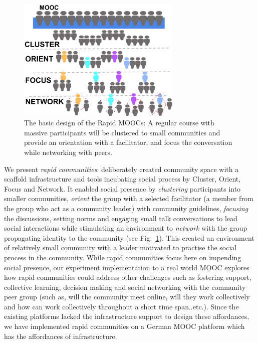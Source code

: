 \documentclass[manuscript,screen,review]{acmart}
\begin{document}
\begin{figure}[h]
  \centering
  \includegraphics[width=0.7\textwidth]{images/Framework.png}
  \caption{The basic design of the Rapid MOOCs: A regular course with massive participants will be clustered to small communities and provide an orientation with a facilitator, and focus the conversation while networking with peers.}
 \label{fig:framework}
\end{figure}

We present \textit{rapid communities}: deliberately created community space with a scaffold infrastructure and tools incubating social process by Cluster, Orient, Focus and Network. It enabled social presence by \textit{clustering} participants into smaller communities, \textit{orient} the group with a selected facilitator (a member from the group who act as a community leader) with community guidelines, \textit{focusing} the discussions, setting norms and engaging small talk conversations to lead social interactions while stimulating an environment to \textit{network} with the group propagating identity to the community (see Fig.~\ref{fig:framework}). This created an environment of relatively small community with a leader motivated to practise the social process in the community. While rapid communities focus here on impending social presence, our experiment implementation to a real world MOOC explores how rapid communities could address other challenges such as fostering support, collective learning, decision making and social networking with the community peer group (such as,  will the community meet online, will they work collectively and how can work collectively throughout a short time span..etc.). Since the existing platforms lacked the infrastructure support to design these affordances, we have implemented rapid communities on a German MOOC platform which has the affordances of infrastructure.
\end{document}
